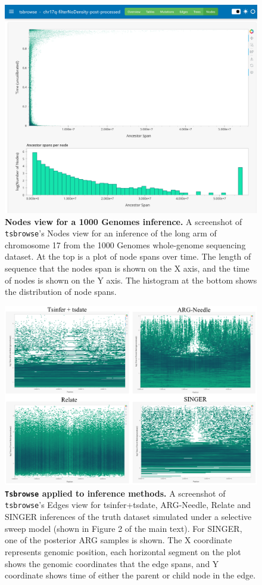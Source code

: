 \documentclass[unnumsec,webpdf,contemporary,large,namedate]{oup-authoring-template}
\begin{document}
\begin{figure}
    \centering
    \includegraphics[width=0.95\linewidth]{figures/SuppFig2.png}
    \caption{\textbf{Nodes view for a 1000 Genomes inference.} A
        screenshot of \texttt{tsbrowse}'s Nodes view for an inference of the long arm
        of chromosome 17 from the 1000 Genomes whole-genome sequencing dataset. At the
        top is a plot of node spans over time. The length of sequence that the nodes
        span is shown on the X axis, and the time of nodes is shown on the Y axis. The
        histogram at the bottom shows the distribution of node spans. }
    \label{fig:Supplementary_Figure_2}
\end{figure}

\begin{figure}
    \centering
    \includegraphics[width=0.95\linewidth]{figures/SuppFig3.png}
    \caption{\textbf{\texttt{Tsbrowse} applied to inference methods.}
    A screenshot of \texttt{tsbrowse}'s Edges view for tsinfer+tsdate,
ARG-Needle, Relate and SINGER inferences of the truth dataset
simulated under a selective sweep model (shown in Figure 2 of the main text). For
SINGER, one of the posterior ARG samples is shown.
The X coordinate represents genomic position, each horizontal segment on the
plot shows the genomic coordinates that the edge spans, and Y coordinate shows
time of either the parent or child node in the edge.}
    \label{fig:Supplementary_Figure_3}
\end{figure}
\end{document}
